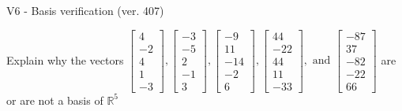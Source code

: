 \begin{exercise}
  \begin{exerciseTitle}V6 - Basis verification (ver. 407)\end{exerciseTitle}
  \begin{exerciseStatement}
    Explain why the vectors \(\left[\begin{array}{r}
4 \\
-2 \\
4 \\
1 \\
-3
\end{array}\right] , \left[\begin{array}{r}
-3 \\
-5 \\
2 \\
-1 \\
3
\end{array}\right] , \left[\begin{array}{r}
-9 \\
11 \\
-14 \\
-2 \\
6
\end{array}\right] , \left[\begin{array}{r}
44 \\
-22 \\
44 \\
11 \\
-33
\end{array}\right] , \text{ and } \left[\begin{array}{r}
-87 \\
37 \\
-82 \\
-22 \\
66
\end{array}\right]\) are or are not a basis of \(\mathbb{R}^5\)	



\end{exerciseStatement}
\end{exercise}
